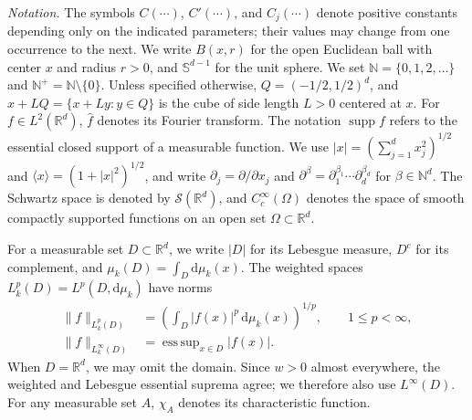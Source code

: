 \documentclass[12pt]{article}
\DeclareMathOperator{\supp}{supp}
\begin{document}
\textit{Notation.} The symbols $C(\cdots)$, $C'(\cdots)$, and $C_j(\cdots)$ denote positive constants depending only on the indicated parameters; their values may change from one occurrence to the next. We write $B(x,r)$ for the open Euclidean ball with center $x$ and radius $r>0$, and $\mathbb{S}^{d-1}$ for the unit sphere. We set $\mathbb{N}=\{0,1,2,\dots\}$ and $\mathbb{N}^+=\mathbb{N}\setminus\{0\}$. Unless specified otherwise, $Q=(-1/2,1/2)^d$, and $x+LQ=\{x+Ly:y\in Q\}$ is the cube of side length $L>0$ centered at $x$. For $f\in L^2(\mathbb{R}^d)$, $\widehat f$ denotes its Fourier transform. The notation $\supp f$ refers to the essential closed support of a measurable function. We use $|x|=(\sum_{j=1}^d x_j^2)^{1/2}$ and $\langle x\rangle=(1+|x|^2)^{1/2}$, and write $\partial_j=\partial/\partial x_j$ and $\partial^\beta=\partial_1^{\beta_1}\cdots\partial_d^{\beta_d}$ for $\beta\in\mathbb{N}^d$. The Schwartz space is denoted by $\mathcal{S}(\mathbb{R}^d)$, and $C_c^\infty(\Omega)$ denotes the space of smooth compactly supported functions on an open set $\Omega\subset\mathbb{R}^d$.

For a measurable set $D\subset\mathbb{R}^d$, we write $|D|$ for its Lebesgue measure, $D^c$ for its complement, and $\mu_k(D)=\int_D\mathrm{d}\mu_k(x)$. The weighted spaces $L_k^p(D)=L^p(D,\mathrm{d}\mu_k)$ have norms
\begin{align*}
\|f\|_{L_k^p(D)}&=\left(\int_D|f(x)|^p\,\mathrm{d}\mu_k(x)\right)^{1/p},\qquad 1\le p<\infty,\\
\|f\|_{L_k^\infty(D)}&=\operatorname{ess\,sup}_{x\in D}|f(x)|.
\end{align*}
When $D=\mathbb{R}^d$, we may omit the domain. Since $w>0$ almost everywhere, the weighted and Lebesgue essential suprema agree; we therefore also use $L^\infty(D)$. For any measurable set $A$, $\chi_A$ denotes its characteristic function.
\end{document}
